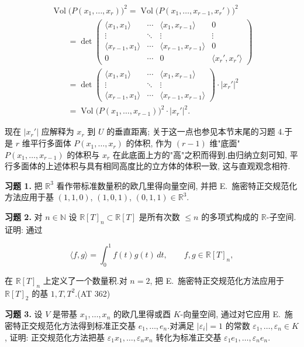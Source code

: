 \[
\begin{array}{l}
\operatorname{Vol}\bigl(P(x_1, \ldots, x_r)\bigr)^2 = \operatorname{Vol}\bigl(P(x_1, \ldots, x_{r-1}, x_r')\bigr)^2 \\
\qquad = \det \begin{pmatrix}
\langle x_1, x_1 \rangle & \cdots & \langle x_1, x_{r-1} \rangle & 0 \\
\vdots & \ddots & \vdots & \vdots \\
\langle x_{r-1}, x_1 \rangle & \cdots & \langle x_{r-1}, x_{r-1} \rangle & 0 \\
0 & \cdots & 0 & \langle x_r', x_r' \rangle
\end{pmatrix} \\
\qquad = \det \begin{pmatrix}
\langle x_1, x_1 \rangle & \cdots & \langle x_1, x_{r-1} \rangle \\
\vdots & \ddots & \vdots \\
\langle x_{r-1}, x_1 \rangle & \cdots & \langle x_{r-1}, x_{r-1} \rangle
\end{pmatrix} \cdot |x_r'|^2 \\
\qquad = \operatorname{Vol}\bigl(P(x_1, \ldots, x_{r-1})\bigr)^2 \cdot |x_r'|^2\text{.}
\end{array}
\]

现在 $|x_r'|$ 应解释为 $x_r$ 到 $U$ 的垂直距离; 关于这一点也参见本节末尾的习题 4.于是 $r$ 维平行多面体 $P(x_1, \ldots, x_r)$ 的体积, 作为 $(r-1)$ 维"底面"$P(x_1, \ldots, x_{r-1})$ 的体积与 $x_r$ 在此底面上方的"高"之积而得到.由归纳立刻可知, 平行多面体的上述体积与具有相同高度比的立方体的体积一致, 这与直观观念相符.

\aufgaben

\medskip
\noindent\textbf{习题 1.} 把 $\mathbb{R}^3$ 看作带标准数量积的欧几里得向量空间, 并把 E.~施密特正交规范化方法应用于基 $(1, 1, 0)$, $(1, 0, 1)$, $(0, 1, 1) \in \mathbb{R}^3$.

\medskip
\noindent\textbf{习题 2.} 对 $n \in \mathbb{N}$ 设 $\mathbb{R}[T]_n \subset \mathbb{R}[T]$ 是所有次数 $\leq n$ 的多项式构成的 $\mathbb{R}$-子空间.证明: 通过

\[
\langle f, g \rangle = \int_{0}^{1} f(t) g(t) \, dt, \qquad f, g \in \mathbb{R}[T]_n,
\]

在 $\mathbb{R}[T]_n$ 上定义了一个数量积.对 $n = 2$, 把 E.~施密特正交规范化方法应用于 $\mathbb{R}[T]_2$ 的基 $1, T, T^2$.(AT 362)

\medskip
\noindent\textbf{习题 3.} 设 $V$ 是带基 $x_1, \ldots, x_n$ 的欧几里得或酉 $K$-向量空间, 通过对它应用 E.~施密特正交规范化方法得到标准正交基 $e_1, \ldots, e_n$.对满足 $|\varepsilon_i| = 1$ 的常数 $\varepsilon_1, \ldots, \varepsilon_n \in K$, 证明: 正交规范化方法把基 $\varepsilon_1 x_1, \ldots, \varepsilon_n x_n$ 转化为标准正交基 $\varepsilon_1 e_1, \ldots, \varepsilon_n e_n$.

